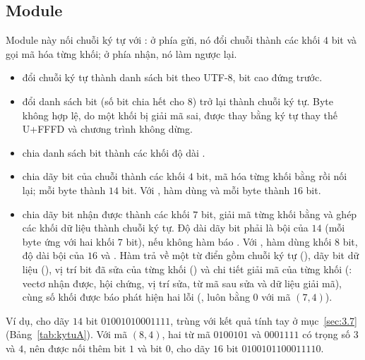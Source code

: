 \subsection{Module }
\label{ss:4.2.3}

Module này nối chuỗi ký tự với : ở phía gửi, nó đổi chuỗi
thành các khối $4$ bit và gọi  mã hóa từng khối; ở phía nhận,
nó làm ngược lại.
\begin{itemize}
  \item {} đổi chuỗi ký tự thành danh sách bit theo
        UTF-8, bit cao đứng trước.
  \item {} đổi danh sách bit (số bit chia hết cho $8$)
        trở lại thành chuỗi ký tự. Byte không hợp lệ, do một khối bị giải mã
        sai, được thay bằng ký tự thay thế U+FFFD và chương trình không dừng.
  \item {} chia danh sách bit thành các khối độ
        dài .
  \item {} chia dãy bit của chuỗi thành các
        khối $4$ bit, mã hóa từng khối bằng  rồi nối lại;
        mỗi byte thành $14$ bit. Với , hàm dùng
         và mỗi byte thành $16$ bit.
  \item {} chia dãy bit nhận được thành
        các khối $7$ bit, giải mã từng khối bằng  và ghép
        các khối dữ liệu thành chuỗi ký tự. Độ dài dãy bit phải là bội của $14$
        (mỗi byte ứng với hai khối $7$ bit), nếu không hàm báo
        . Với , hàm dùng khối $8$ bit,
        độ dài bội của $16$ và .
        Hàm trả về một từ điển gồm chuỗi ký tự (), dãy bit dữ liệu
        (), vị trí bit đã sửa của từng khối
        () và chi tiết giải mã của từng khối
        (: vectơ nhận được, hội chứng, vị trí sửa, từ mã sau sửa
        và dữ liệu giải mã), cùng số khối được báo phát hiện hai lỗi
        (, luôn bằng $0$ với mã $(7,4)$).
\end{itemize}

Ví dụ,  cho dãy $14$ bit $01001010001111$, trùng với
kết quả tính tay ở mục~\ref{sec:3.7} (Bảng~\ref{tab:kytuA}). Với mã $(8,4)$,
hai từ mã $0100101$ và $0001111$ có trọng số $3$ và $4$, nên được nối thêm bit
$1$ và bit $0$, cho dãy $16$ bit $0100101100011110$.

